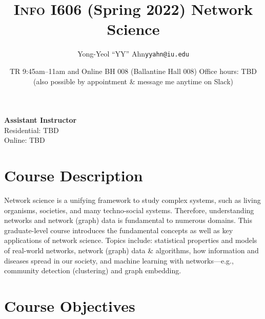 \documentclass[11pt,article,oneside]{memoir} %
\makeatletter
\def\myauthor{Author}
\def\mytitle{Title}
\def\myemail{yyahn@iu.edu}
\def\myauthor{Yong-Yeol ``YY'' Ahn}
\def\mytitle{{\normalsize \textsc{Info} I606 (Spring 2022) \newline} \HUGE Network Science}
\makeatother
\begin{document}


\def\ind{\hangindent=1 true cm\hangafter=1 \noindent}
\def\labelitemi{$\cdot$}


\title{\LARGE \mytitle}
\author{\Large\myauthor \newline \footnotesize\texttt{\noindent\myemail}}
\date{TR 9:45am--11am and Online%
\newline BH 008 (Ballantine Hall 008) 
\newline Office hours: TBD (also possible by appointment \& message me anytime on Slack)}

\maketitle
\vspace{-20pt}
{\bfseries Assistant Instructor} \\ Residential: TBD \\ Online: TBD

\section{Course Description} %

Network science is a unifying framework to study complex systems, such as living organisms, societies, and many techno-social systems. 
Therefore, understanding networks and network (graph) data is fundamental to numerous domains. 
This graduate-level course introduces the fundamental concepts as well as key applications of network science.
Topics include: statistical properties and models of real-world networks, network (graph) data \& algorithms, how information and diseases spread in our society, and machine learning with networks---e.g., community detection (clustering) and graph embedding.

\section{Course Objectives} %
\end{document}
